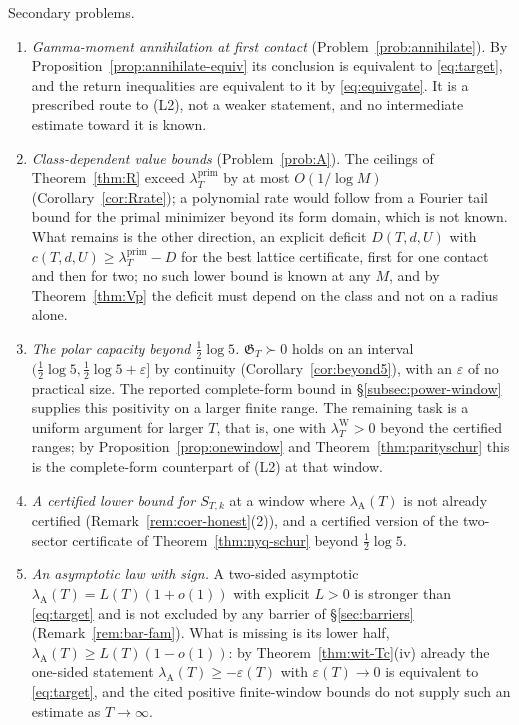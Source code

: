 \documentclass[11pt]{amsart}
\theoremstyle{definition}
\theoremstyle{remark}
\newcommand{\lamP}{\lambda^{\mathrm{prim}}_T}
\newcommand{\lamW}{\lambda^{\mathrm W}_T}
\newcommand{\lamA}{\lambda_{\mathrm A}(T)}
\begin{document}
Secondary problems.
\begin{enumerate}
\item \emph{Gamma-moment annihilation at first contact} (Problem~\ref{prob:annihilate}). By
Proposition~\ref{prop:annihilate-equiv} its conclusion is equivalent to \eqref{eq:target}, and the return
inequalities are equivalent to it by \eqref{eq:equivgate}. It is a prescribed route to (L2), not a weaker
statement, and no intermediate estimate toward it is known.
\item \emph{Class-dependent value bounds} (Problem~\ref{prob:A}). The ceilings of Theorem~\ref{thm:R} exceed
$\lamP$ by at most $O(1/\log M)$ (Corollary~\ref{cor:Rrate}); a polynomial rate would follow from a Fourier tail
bound for the primal minimizer beyond its form domain, which is not known. What remains is the other direction, an
explicit deficit $D(T,d,U)$ with $c(T,d,U)\ge\lamP-D$ for the best lattice certificate, first for one contact and
then for two; no such lower bound is known at any $M$, and by Theorem~\ref{thm:Vp} the deficit must depend on
the class and not on a radius alone.
\item \emph{The polar capacity beyond $\frac12\log5$.} $\mathfrak G_T\succ0$ holds on an interval
$(\frac12\log5,\frac12\log5+\varepsilon]$ by continuity (Corollary~\ref{cor:beyond5}), with an $\varepsilon$ of no
practical size. The reported complete-form bound in \S\ref{subsec:power-window} supplies this positivity on a larger finite range.
The remaining task is a uniform argument for larger $T$, that is, one with
$\lamW>0$ beyond the certified ranges; by Proposition~\ref{prop:onewindow} and Theorem~\ref{thm:parityschur}
this is the complete-form counterpart of (L2) at that window.
\item \emph{A certified lower bound for $S_{T,k}$} at a window where $\lamA$ is not already certified
(Remark~\ref{rem:coer-honest}(2)), and a certified version of the two-sector certificate of
Theorem~\ref{thm:nyq-schur} beyond $\frac12\log5$.
\item \emph{An asymptotic law with sign.} A two-sided asymptotic $\lamA=L(T)(1+o(1))$ with explicit $L>0$ is
stronger than \eqref{eq:target} and is not excluded by any barrier of \S\ref{sec:barriers}
(Remark~\ref{rem:bar-fam}). What is missing is its lower half, $\lamA\ge L(T)(1-o(1))$: by
Theorem~\ref{thm:wit-Tc}(iv) already the one-sided statement $\lamA\ge-\varepsilon(T)$ with $\varepsilon(T)\to0$ is
equivalent to \eqref{eq:target}, and the cited positive finite-window bounds do not supply such an estimate as $T\to\infty$.

\end{enumerate}
\end{document}
